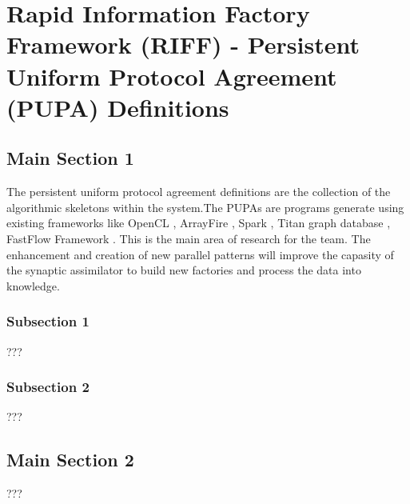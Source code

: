 
\chapter{Rapid Information Factory Framework (RIFF) - Persistent Uniform Protocol Agreement (PUPA) Definitions} %

\label{Chapter21} %



\section{Main Section 1}

The persistent uniform protocol agreement definitions are the collection of the algorithmic skeletons within the system.The PUPAs are programs generate using existing frameworks like OpenCL \cite{stone2010opencl}, ArrayFire \cite{malcolm2012arrayfire}, Spark \cite{hintjens2011omq}, Titan graph database \cite{tanase2014highly} \cite{mishra2014titan}, FastFlow Framework \cite{aldinucci2011accelerating}. This is the main area of research for the team. The enhancement and creation of new parallel patterns will improve the capasity of the synaptic assimilator to build new factories and process the data into knowledge.

\subsection{Subsection 1}

???


\subsection{Subsection 2}

???


\section{Main Section 2}

???
